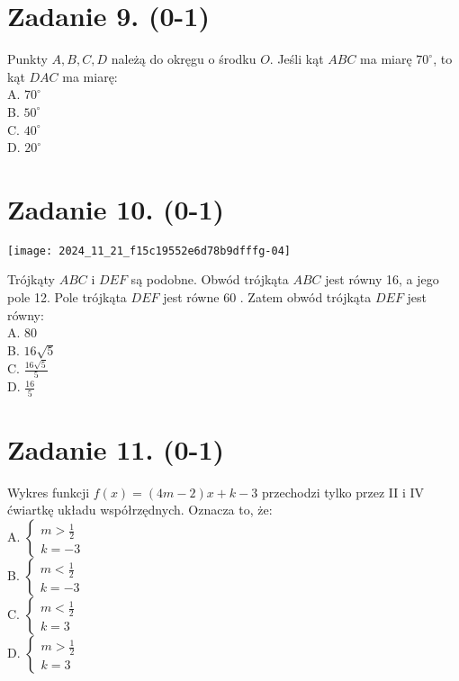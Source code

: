\documentclass[10pt]{article}
\begin{document}
\section*{Zadanie 9. (0-1)}
Punkty \(A, B, C, D\) należą do okręgu o środku \(O\). Jeśli kąt \(A B C\) ma miarę \(70^{\circ}\), to kąt \(D A C\) ma miarę:\\
A. \(70^{\circ}\)\\
B. \(50^{\circ}\)\\
C. \(40^{\circ}\)\\
D. \(20^{\circ}\)

\section*{Zadanie 10. (0-1)}
\begin{center}
\texttt{[image: 2024\_11\_21\_f15c19552e6d78b9dfffg-04]}
\end{center}

Trójkąty \(A B C\) i \(D E F\) są podobne. Obwód trójkąta \(A B C\) jest równy 16, a jego pole 12. Pole trójkąta \(D E F\) jest równe 60 . Zatem obwód trójkąta \(D E F\) jest równy:\\
A. 80\\
B. \(16 \sqrt{5}\)\\
C. \(\frac{16 \sqrt{5}}{5}\)\\
D. \(\frac{16}{5}\)

\section*{Zadanie 11. (0-1)}
Wykres funkcji \(f(x)=(4 m-2) x+k-3\) przechodzi tylko przez II i IV ćwiartkę układu współrzędnych. Oznacza to, że:\\
A. \(\left\{\begin{array}{l}m>\frac{1}{2} \\ k=-3\end{array}\right.\)\\
B. \(\left\{\begin{array}{l}m<\frac{1}{2} \\ k=-3\end{array}\right.\)\\
C. \(\left\{\begin{array}{l}m<\frac{1}{2} \\ k=3\end{array}\right.\)\\
D. \(\left\{\begin{array}{l}m>\frac{1}{2} \\ k=3\end{array}\right.\)
\end{document}
